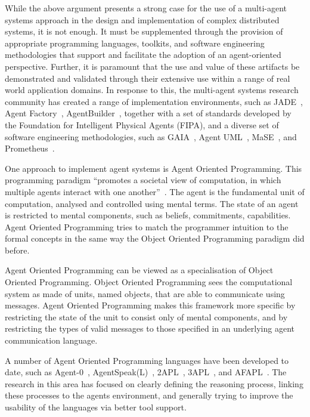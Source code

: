 \documentclass[a4paper,12pt,oneside,fleqn]{book} %
\begin{document}
While the above argument presents a strong case for the use of a multi-agent
systems approach in the design and implementation of complex distributed
systems, it is not enough. It must be supplemented through the provision of
appropriate programming languages, toolkits, and software engineering
methodologies that support and facilitate the adoption of an agent-oriented
perspective. Further, it is paramount that the use and value of these artifacts
be demonstrated and validated through their extensive use within a range of
real world application domains. In response to this, the multi-agent systems
research community has created a range of implementation environments, such as
JADE~\cite{DBLP:books/sp/map2005/BellifemineBCP05}, Agent
Factory~\cite{collier1999agent}, AgentBuilder~\cite{web:agb04},
together with a set of standards developed by the Foundation for
Intelligent Physical Agents (FIPA), and a diverse set of software engineering
methodologies, such as GAIA~\cite{DBLP:journals/aamas/WooldridgeJK00}, Agent
UML~\cite{bauer2001agent}, MaSE~\cite{deloach2001analysis}, and
Prometheus~\cite{DBLP:conf/atal/PadghamW02}.

One approach to implement agent systems is Agent Oriented Programming.
This programming paradigm ``promotes a societal view of computation, in
which multiple agents interact with one
another''~\cite{DBLP:journals/ai/Shoham93}.  The agent is the fundamental
unit of computation, analysed and controlled using mental terms.  The state
of an agent is restricted to mental components, such as beliefs,
commitments, capabilities. Agent Oriented Programming tries to match the
programmer intuition to the formal concepts in the same way the Object
Oriented Programming paradigm did before.

Agent Oriented Programming can be viewed as a specialisation of Object
Oriented Programming\null. Object Oriented Programming sees the
computational system as made of units, named objects, that are able to
communicate using messages. Agent Oriented Programming makes this framework
more specific by restricting the state of the unit to consist only of
mental components, and by restricting the types of valid messages to those
specified in an underlying agent communication language.

A number of Agent Oriented Programming languages have been developed to
date, such as Agent-0~\cite{DBLP:journals/ai/Shoham93},
AgentSpeak(L)~\cite{DBLP:conf/maamaw/Rao96},
2APL~\cite{DBLP:journals/aamas/Dastani08},
3APL~\cite{DBLP:conf/promas/DastaniRDM03}, and
AFAPL~\cite{DBLP:conf/seke/CollierOR04}. The research in this area has
focused on clearly defining the reasoning process, linking these processes
to the agents environment, and generally trying to improve the usability of
the languages via better tool support.
\end{document}
